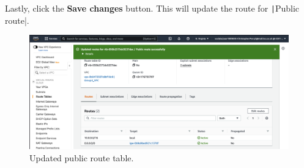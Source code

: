 Lastly, click the \textbf{Save changes} button.
This will update the route for \texttt|Public route|.

\begin{figure}[!htbp]
    \centering
    \includegraphics[width=150mm]{resources/vpc/routes/vpc-public-route-after}
    \caption{Updated public route table.}
    \label{fig:vpc-public-route-after}
\end{figure}
